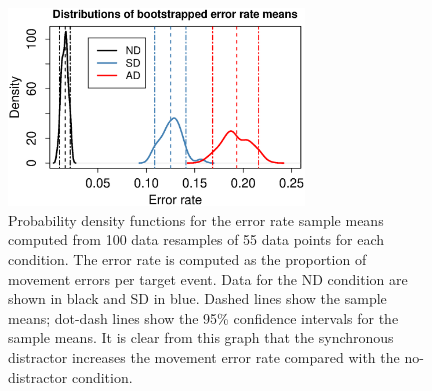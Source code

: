\documentclass[10pt,letterpaper]{article}
\begin{document}
\begin{figure}[htb!]
\centering
\includegraphics[width=0.7\textwidth]{./figures/bootstrap_errors.eps}
\caption[Bootstrapped error PDFS] {Probability density functions for
  the error rate sample means computed from 100 data resamples of 55
  data points for each condition. The error rate is computed as the
  proportion of movement errors per target event. Data for the ND
  condition are shown in black and SD in blue. Dashed lines show the
  sample means; dot-dash lines show the 95\% confidence intervals for
  the sample means. It is clear from this graph that
  the synchronous distractor increases the movement error rate
  compared with the no-distractor condition.}
\label{bootstrap_errors}
\end{figure}


\end{document}
